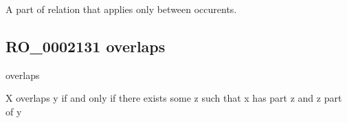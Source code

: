 \documentclass[letterpaper,10pt,english]{sphinxmanual}
\begin{document}
\begin{sphinxShadowBox}

\sphinxAtStartPar
A part of relation that applies only between occurents.
\end{sphinxShadowBox}

\begin{sphinxShadowBox}

\sphinxAtStartPar
{}

\sphinxAtStartPar
{}
\end{sphinxShadowBox}
\begin{quote}

\ignorespaces \end{quote}


\subsection{RO\_0002131 \sphinxhyphen{} overlaps}
\label{\detokenize{doc-RO_0002131:ro-0002131-overlaps}}\label{\detokenize{doc-RO_0002131:index-0}}\label{\detokenize{doc-RO_0002131::doc}}
\begin{sphinxShadowBox}

\sphinxAtStartPar
overlaps
\end{sphinxShadowBox}

\begin{sphinxShadowBox}

\sphinxAtStartPar
X overlaps y if and only if there exists some z such that x has part z and z part of y
\end{sphinxShadowBox}

\begin{sphinxShadowBox}

\sphinxAtStartPar
{}
\end{sphinxShadowBox}
\begin{quote}

\ignorespaces \end{quote}
\end{document}
